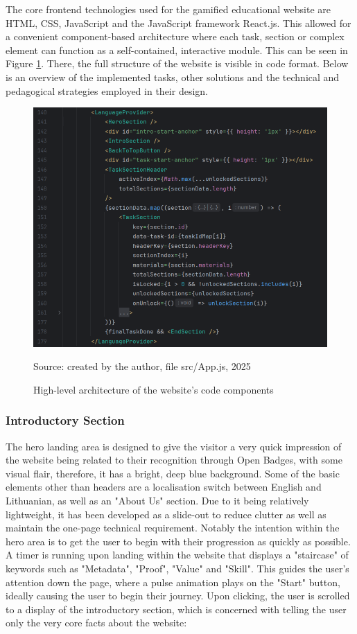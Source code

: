 The core frontend technologies used for the gamified educational website are HTML, CSS, JavaScript and the JavaScript framework React.js. 
This allowed for a convenient component-based architecture where each task, section or complex element can function as a self-contained, interactive module. 
This can be seen in Figure \ref{fig:app_composition}. 
There, the full structure of the website is visible in code format.
Below is an overview of the implemented tasks, other solutions and the technical and pedagogical strategies employed in their design.

\begin{figure}[htbp]
 \centering
 \includegraphics[width=14cm]{Media/app_composition.png}
 \caption{High-level architecture of the website's code components}
 \label{fig:app_composition}
 {\raggedright \small{Source: created by the author, file src/App.js, 2025}\par}
\end{figure}

\subsubsection{Introductory Section}
The hero landing area is designed to give the visitor a very quick impression of the website being related to their recognition through Open Badges, with some visual flair, therefore, it has a bright, deep blue background. 
Some of the basic elements other than headers are a localisation switch between English and Lithuanian, as well as an "About Us" section. 
Due to it being relatively lightweight, it has been developed as a slide-out to reduce clutter as well as maintain the one-page technical requirement. 
Notably the intention within the hero area is to get the user to begin with their progression as quickly as possible. 
A timer is running upon landing within the website that displays a "staircase" of keywords such as "Metadata", "Proof", "Value" and "Skill". 
This guides the user's attention down the page, where a pulse animation plays on the "Start" button, ideally causing the user to begin their journey. 
Upon clicking, the user is scrolled to a display of the introductory section, which is concerned with telling the user only the very core facts about the website:

